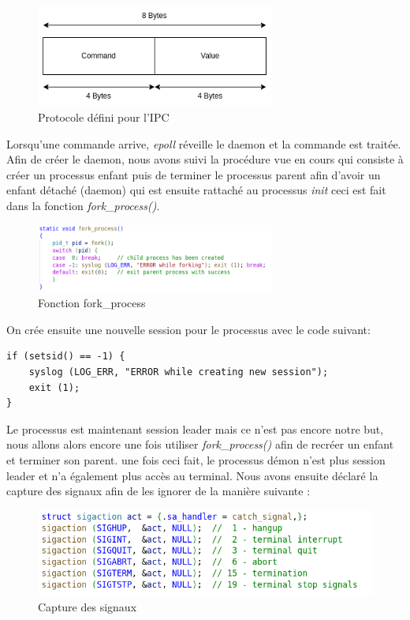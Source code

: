 \documentclass{ReportTemplate}
\begin{document}
\begin{figure}[H]
    \centering
    \includegraphics[width= 0.7\textwidth]{imageSources/Protocol.png}
    \caption{Protocole défini pour l'IPC}
    \label{fig:Protocol}
\end{figure}
Lorsqu'une commande arrive, \textit{epoll} réveille le daemon et la commande est
traitée.\newpage
Afin de créer le daemon, nous avons suivi la procédure vue en cours qui consiste
à créer un processus enfant puis de terminer le processus parent afin d'avoir un
enfant détaché (daemon) qui est ensuite rattaché au processus \textit{init} ceci est fait dans la fonction \textit{fork\_process()}.
\begin{figure}[H]
    \centering
    \includegraphics[width= 0.7\textwidth]{imageSources/fork_process.png}
    \caption{Fonction fork\_process}
    \label{fig:ForkProcess}
\end{figure}
On crée ensuite une nouvelle session pour le processus avec le code
suivant:
\begin{verbatim}
if (setsid() == -1) {
    syslog (LOG_ERR, "ERROR while creating new session"); 
    exit (1);
}
\end{verbatim}
Le processus est maintenant session leader mais ce n'est pas encore notre but,
nous allons alors encore une fois utiliser \textit{fork\_process()} afin de
recréer un enfant et terminer son parent. une fois ceci fait, le processus démon
n'est plus session leader et n'a également plus accès au terminal.\newline
Nous avons ensuite déclaré la capture des signaux afin de les ignorer de la
manière suivante :
\begin{figure}[H]
    \centering
    \includegraphics[width= \textwidth]{imageSources/signals_capture.png}
    \caption{Capture des signaux}
    \label{fig:SignalsCapture}
\end{figure}
\end{document}
